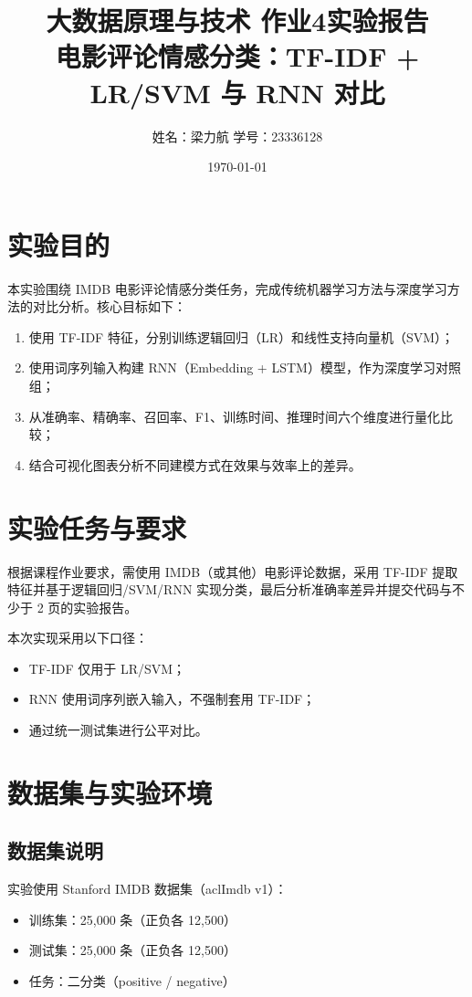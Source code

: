 \documentclass[UTF8,a4paper,12pt]{ctexart}
\title{大数据原理与技术 作业4实验报告\\电影评论情感分类：TF-IDF + LR/SVM 与 RNN 对比}
\author{姓名：梁力航 \quad 学号：23336128}
\date{\today}
\begin{document}
\maketitle

\section{实验目的}
本实验围绕 IMDB 电影评论情感分类任务，完成传统机器学习方法与深度学习方法的对比分析。核心目标如下：
\begin{enumerate}
    \item 使用 TF-IDF 特征，分别训练逻辑回归（LR）和线性支持向量机（SVM）；
    \item 使用词序列输入构建 RNN（Embedding + LSTM）模型，作为深度学习对照组；
    \item 从准确率、精确率、召回率、F1、训练时间、推理时间六个维度进行量化比较；
    \item 结合可视化图表分析不同建模方式在效果与效率上的差异。
\end{enumerate}

\section{实验任务与要求}
根据课程作业要求，需使用 IMDB（或其他）电影评论数据，采用 TF-IDF 提取特征并基于逻辑回归/SVM/RNN 实现分类，最后分析准确率差异并提交代码与不少于 2 页的实验报告。

本次实现采用以下口径：
\begin{itemize}
    \item TF-IDF 仅用于 LR/SVM；
    \item RNN 使用词序列嵌入输入，不强制套用 TF-IDF；
    \item 通过统一测试集进行公平对比。
\end{itemize}

\section{数据集与实验环境}
\subsection{数据集说明}
实验使用 Stanford IMDB 数据集（aclImdb v1）：
\begin{itemize}
    \item 训练集：25,000 条（正负各 12,500）
    \item 测试集：25,000 条（正负各 12,500）
    \item 任务：二分类（positive / negative）
\end{itemize}
\end{document}
